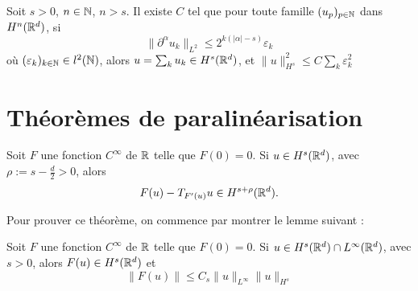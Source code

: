 \documentclass[11pt,a4paper]{article}
\begin{document}
\begin{thm}[]\label{meyer}
Soit $s>0$, $n\in \mathbb N$, $n>s$. Il existe $C$ tel que pour toute famille $(u_p)_{p\in \mathbb N}$ dans $H^n(\mathbb R^d)$, si
\begin{equation*}
\| \partial ^\alpha u_k \|_{L^2} \leq 2^{k(|\alpha|-s)}\varepsilon_k
\end{equation*}
où $(\varepsilon_k)_{k\in \mathbb N} \in l^2(\mathbb N)$, alors $u=\sum_k u_k \in H^s(\mathbb R^d) $, et $ \|u\|_{H^s}^2 \leq C \sum_k \varepsilon_k^2 $
\end{thm}


\section{Théorèmes de paralinéarisation}

\begin{thm}\label{paralin}
Soit $F$ une fonction $C^{\infty}$ de $\mathbb R$ telle que $F(0)=0$. Si $u\in H^s(\mathbb R^d)$, avec $\rho := s - \frac{d}{2}>0 $, alors 
\begin{equation}
F(u) - T_{F'(u)}u \in H^{s+\rho}(\mathbb R^d).
\end{equation}
\end{thm}
Pour prouver ce théorème, on commence par montrer le lemme suivant : 

\begin{lemma}
Soit $F$ une fonction $C^{\infty}$ de $\mathbb R$ telle que $F(0)=0$. Si $u\in H^s(\mathbb R^d)\cap L^{\infty}(\mathbb R^d) $, avec $s>0 $, alors $F(u) \in H^s(\mathbb R^d)$ et 
\begin{equation}
\|F(u)\| \leq C_s \|u\|_{L^{\infty}} \|u\|_{H^s}
\end{equation}
\end{lemma}
\end{document}
